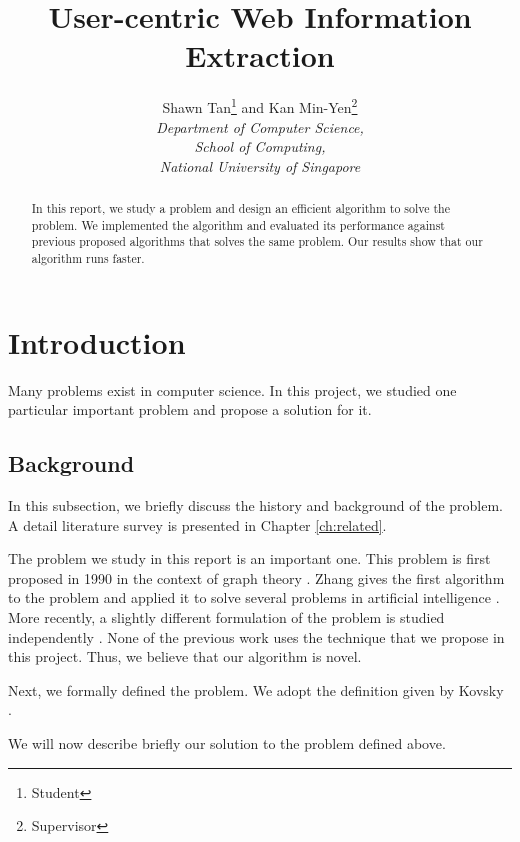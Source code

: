 \documentclass[a4paper,12pt]{nurop}
\begin{document}
\title{User-centric Web Information Extraction}

\author{\large{Shawn Tan}\footnote{Student} and \large{Kan Min-Yen}\footnote{Supervisor}\\
	\normalsize\textit{Department of Computer Science,\\
	School of Computing,\\
	National University of Singapore} 
}
\maketitle

\begin{abstract}
	In this report, we study a problem and design an efficient algorithm
	to solve the problem.  We implemented the algorithm and evaluated
	its performance against previous proposed algorithms that solves the
	same problem.  Our results show that our algorithm runs faster.
\end{abstract}

\section{Introduction}
Many problems exist in computer science.  In this project, we 
studied one particular important problem and propose a solution 
for it.  

\subsection{Background}
In this subsection, we briefly discuss the history and background
of the problem.  A detail literature survey is presented in 
Chapter \ref{ch:related}.

The problem we study in this report is an important one.
This problem is first proposed in 1990 in the context
of graph theory \cite{smith90graph}.  Zhang gives the
first algorithm to the problem and applied it to solve several 
problems in artificial intelligence \cite{zhang91ai,zhang92ai}.  
More recently, a slightly different formulation of the problem
is studied independently \cite{kovsky92diff,ali94diff}.  None of the previous work
uses the technique that we propose in this project.  Thus, we 
believe that our algorithm is novel.

Next, we formally defined the problem.  We adopt
the definition given by Kovsky \cite{kovsky92diff}.

We will now describe briefly our solution to the problem
defined above.
\end{document}
